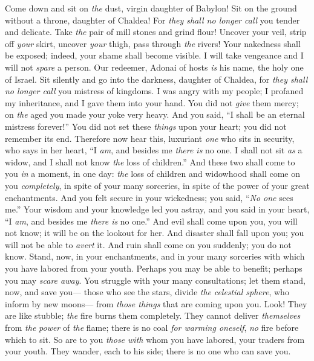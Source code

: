 \begin{biblechapter} %
 Come down and sit on \textit{the} dust, virgin daughter of Babylon! 
Sit on the ground without a throne, daughter of Chaldea! 
For \textit{they shall no longer call} you tender and delicate.
\verse Take \textit{the} pair of mill stones and grind flour! 
Uncover your veil, 
strip off \textit{your} skirt, 
uncover \textit{your} thigh, 
pass through \textit{the} rivers!
\verse Your nakedness shall be exposed; 
indeed, your shame shall become visible. 
I will take vengeance 
and I will not \textit{spare} a person.
\verse Our redeemer, Adonai of hosts \textit{is} his name, the holy one of Israel.
\verse Sit silently and go into the darkness, daughter of Chaldea, 
for \textit{they shall no longer call} you mistress of kingdoms.
\verse I was angry with my people; 
I profaned my inheritance, 
and I gave them into your hand. 
You did not \textit{give} them mercy; 
on \textit{the} aged you made your yoke very heavy.
\verse And you said, “I shall be an eternal mistress forever!” 
You did not set these \textit{things} upon your heart; 
you did not remember its end.
\verse Therefore now hear this, luxuriant \textit{one} who sits in security, 
who says in her heart, “I \textit{am}, and besides me \textit{there is} no one. 
I shall not sit \textit{as} a widow, 
and I shall not know \textit{the} loss of children.”
\verse And these two shall come to you \textit{in} a moment, in one day: 
\textit{the} loss of children and widowhood shall come on you \textit{completely}, 
in spite of your many sorceries, 
in spite of the power of your great enchantments.
\verse And you felt secure in your wickedness; 
you said, “\textit{No one} sees me.” 
Your wisdom and your knowledge led you astray, 
and you said in your heart, “I \textit{am}, and besides me \textit{there is} no one.”
\verse And evil shall come upon you, you will not know; 
it will be on the lookout for her. 
And disaster shall fall upon you; you will not be able to \textit{avert} it. 
And ruin shall come on you suddenly; you do not know.
\verse Stand, now, in your enchantments, 
and in your many sorceries with which you have labored from your youth. 
Perhaps you may be able to benefit; 
perhaps you may \textit{scare away}.
\verse You struggle with your many consultations; 
let them stand, now, and save you— 
those who see the stars, divide \textit{the} \textit{celestial sphere}, 
who inform by new moons— 
from \textit{those things} that are coming upon you.
\verse Look! They are like stubble; 
\textit{the} fire burns them completely. 
They cannot deliver \textit{themselves} from \textit{the} \textit{power} of \textit{the} flame; 
there is no coal \textit{for warming oneself}, 
\textit{no} fire before which to sit.
\verse So are to you \textit{those with} whom you have labored, 
your traders from your youth. 
They wander, each to his side; 
there is no one who can save you.
\end{biblechapter}

